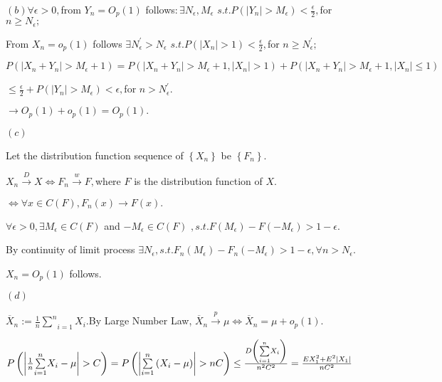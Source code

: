 \documentclass{article}
\begin{document}
$\left( b\right) \forall \epsilon >0,$from $Y_{n}=O_{p}\left( 1\right) $
follows$:\exists N_{\epsilon },M_{\epsilon }$ $s.t.P\left( \left\vert
Y_{n}\right\vert >M_{\epsilon }\right) <\frac{\epsilon }{2},$for $n\geq
N_{\epsilon };$

\qquad From $X_{n}=o_{p}\left( 1\right) $ follows $\exists N_{\epsilon
}^{\prime }>N_{\epsilon }$ $s.t.P\left( \left\vert X_{n}\right\vert
>1\right) <\frac{\epsilon }{2},$for $n\geq N_{\epsilon }^{\prime };$

$P\left( \left\vert X_{n}+Y_{n}\right\vert >M_{\epsilon }+1\right) =P\left(
\left\vert X_{n}+Y_{n}\right\vert >M_{\epsilon }+1,\left\vert
X_{n}\right\vert >1\right) +P\left( \left\vert X_{n}+Y_{n}\right\vert
>M_{\epsilon }+1,\left\vert X_{n}\right\vert \leq 1\right) $

$\leq \frac{\epsilon }{2}+P\left( \left\vert Y_{n}\right\vert >M_{\epsilon
}\right) <\epsilon ,$for $n>N_{\epsilon }^{\prime }.$

$\rightarrow O_{p}\left( 1\right) +o_{p}\left( 1\right) =O_{p}\left(
1\right) .$

$\left( c\right) $

\bigskip Let the distribution function sequence of $\left\{ X_{n}\right\} $
be $\left\{ F_{n}\right\} .$

$X_{n}\overset{D}{\rightarrow }X\iff F_{n}\overset{w}{\rightarrow }F,$where $%
F$ is the distribution function of $X.$

$\iff \forall x\in C\left( F\right) ,F_{n}\left( x\right) \rightarrow
F\left( x\right) .$

$\forall \epsilon >0,\exists M_{\epsilon }\in C\left( F\right) $ and $%
-M_{\epsilon }\in C\left( F\right) $ $,s.t.F\left( M_{\epsilon }\right)
-F\left( -M_{\epsilon }\right) >1-\epsilon .$

By continuity of limit process $\exists N_{\epsilon },s.t.F_{n}\left(
M_{\epsilon }\right) -F_{n}\left( -M_{\epsilon }\right) >1-\epsilon ,\forall
n>N_{\epsilon }.$

$X_{n}=O_{p}\left( 1\right) $ follows.

$\left( d\right) $

\bigskip $\overline{X}_{n}:=\frac{1}{n}\underset{i=1}{\overset{n}{\sum }}%
X_{i}.$By Large Number Law, $\overline{X}_{n}\overset{p}{\rightarrow }\mu
\iff \overline{X}_{n}=\mu +o_{p}\left( 1\right) .$

$P\left( \left\vert \frac{1}{n}\underset{i=1}{\overset{n}{\sum }}X_{i}-\mu
\right\vert >C\right) =P\left( \left\vert \underset{i=1}{\overset{n}{\sum }}%
\left( X_{i}-\mu \right) \right\vert >nC\right) \leq \frac{D\left( \underset{%
i=1}{\overset{n}{\sum }}X_{i}\right) }{n^{2}C^{2}}=\frac{EX_{1}^{2}+E^{2}%
\left\vert X_{1}\right\vert }{nC^{2}}$
\end{document}
